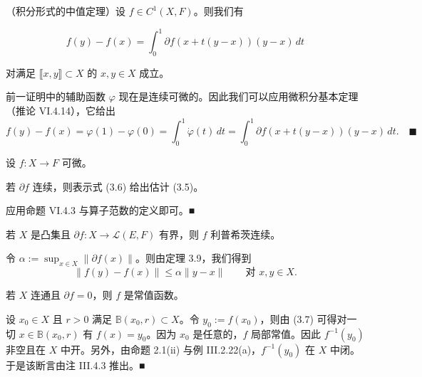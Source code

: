 \begin{theorem}

（积分形式的中值定理）设 $ f \in C^1(X, F) $。则我们有

\begin{equation}
f(y) - f(x) = \int_0^1 \partial f(x + t(y - x))(y - x)\,dt\tag{3.6}
\end{equation}

对满足 $ \llbracket x, y \rrbracket \subset X $ 的 $ x, y \in X $ 成立。

\proofhead
前一证明中的辅助函数 $ \varphi $ 现在是连续可微的。因此我们可以应用微积分基本定理（推论 VI.4.14），它给出
\[
f(y) - f(x) = \varphi(1) - \varphi(0) = \int_0^1 \dot\varphi(t)\,dt = \int_0^1 \partial f(x + t(y - x))(y - x)\,dt .\quad\blacksquare
\]
\end{theorem}

\begin{remark}

设 $ f : X \to F $ 可微。

\begin{items}
\item

若 $ \partial f $ 连续，则表示式 (3.6) 给出估计 (3.5)。

\proofhead
应用命题 VI.4.3 与算子范数的定义即可。\nobreak\hspace{0.35em}■
\item

若 $ X $ 是凸集且 $ \partial f : X \to \mathcal{L}(E, F) $ 有界，则 $ f $ 利普希茨连续。

\proofhead
令 $ \alpha := \sup_{x \in X}\|\partial f(x)\| $。则由定理 3.9，我们得到
\begin{equation}
\|f(y) - f(x)\| \le \alpha\|y - x\| \qquad \text{对 } x, y \in X .\tag{3.7}
\end{equation}
\item

若 $ X $ 连通且 $ \partial f = 0 $，则 $ f $ 是常值函数。

\proofhead
设 $ x_0 \in X $ 且 $ r > 0 $ 满足 $ \mathbb{B}(x_0, r) \subset X $。令 $ y_0 := f(x_0) $，则由 (3.7) 可得对一切 $ x \in \mathbb{B}(x_0, r) $ 有 $ f(x) = y_0 $。因为 $ x_0 $ 是任意的，$ f $ 局部常值。因此 $ f^{-1}(y_0) $ 非空且在 $ X $ 中开。另外，由命题 2.1(ii) 与例 III.2.22(a)，$ f^{-1}(y_0) $ 在 $ X $ 中闭。于是该断言由注 III.4.3 推出。\nobreak\hspace{0.35em}■
\end{items}

\end{remark}

